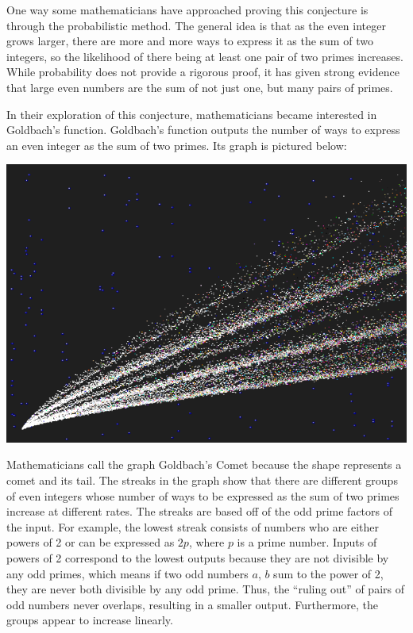 \documentclass{article}
\begin{document}
One way some mathematicians have approached proving this conjecture is through the probabilistic method. The general idea is that as the even integer grows larger, there are more and more ways to express it as the sum of two integers, so the likelihood of there being at least one pair of two primes increases. While probability does not provide a rigorous proof, it has given strong evidence that large even numbers are the sum of not just one, but many pairs of primes.

In their exploration of this conjecture, mathematicians became interested in Goldbach’s function. Goldbach’s function outputs the number of ways to express an even integer as the sum of two primes. Its graph is pictured below:
\begin{center}
    \includegraphics[scale=0.4]{images/goldbach-comet.png}
\end{center}
Mathematicians call the graph Goldbach’s Comet because the shape represents a comet and its tail. The streaks in the graph show that there are different groups of even integers whose number of ways to be expressed as the sum of two primes increase at different rates. The streaks are based off of the odd prime factors of the input. For example, the lowest streak consists of numbers who are either powers of 2 or can be expressed as $2p$, where $p$ is a prime number. Inputs of powers of 2 correspond to the lowest outputs because they are not divisible by any odd primes, which means if two odd numbers $a$, $b$ sum to the power of 2, they are never both divisible by any odd prime. Thus, the “ruling out” of pairs of odd numbers never overlaps, resulting in a smaller output. Furthermore, the groups appear to increase linearly.
\end{document}
